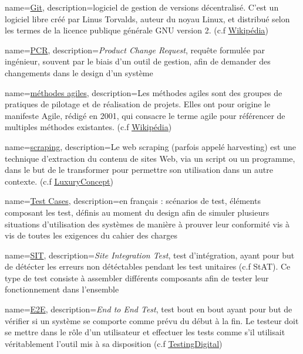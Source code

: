 {
	name=\underline{Git},
	description={logiciel de gestion de versions décentralisé. C'est un logiciel libre créé par Linus Torvalds, auteur du noyau Linux, et distribué selon les termes de la licence publique générale GNU version 2.  (c.f \underline{\href{https://fr.wikipedia.org/wiki/Git}{Wikipédia}})}
}

{
	name=\underline{PCR},
	description={\textit{Product Change Request}, requête formulée par ingénieur, souvent par le biais d'un outil de gestion, afin de demander des changements dans le design d'un système}
}

{
	name=\underline{méthodes agiles},
	description={Les méthodes agiles sont des groupes de pratiques de pilotage et de réalisation de projets. Elles ont pour origine le manifeste Agile, rédigé en 2001, qui consacre le terme agile pour référencer de multiples méthodes existantes. (c.f \underline{\href{https://fr.wikipedia.org/wiki/Méthode_agile}{Wikipédia}})}
}

{
	name=\underline{scraping},
	description={Le web scraping (parfois appelé harvesting) est une technique d'extraction du contenu de sites Web, via un script ou un programme, dans le but de le transformer pour permettre son utilisation dans un autre contexte. (c.f \underline{\href{https://www.luxury-concept.com/dev-blog/346-le-scaping-des-donnees-pourquoi-et-comment.html}{LuxuryConcept}})}
}

{
	name=\underline{Test Cases},
	description={en français : scénarios de test, éléments composant les test, définis au moment du design afin de simuler plusieurs situations d'utilisation des systèmes de manière à prouver leur conformité vis à vis de toutes les exigences du cahier des charges}
	}

{
	name=\underline{SIT},
	description={\textit{Site Integration Test}, test d'intégration, ayant pour but de détécter les erreurs non détéctables pendant les test unitaires (c.f StAT). Ce type de test consiste à assembler différents composants afin de tester leur fonctionnement dans l'ensemble}
	}	
	
{
	name=\underline{E2E},
	description={\textit{End to End Test}, test bout en bout ayant pour but de vérifier si un système se comporte comme prévu du début à la fin. Le testeur doit se mettre dans le rôle d’un utilisateur et effectuer les tests comme s’il utilisait véritablement l’outil mis à sa disposition (c.f \underline{\href{https://blog.testingdigital.com/quest-test-de-bout-bout-end-to-end-1288}{TestingDigital}})}
	}

